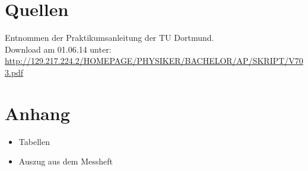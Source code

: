 \documentclass[11pt,ngerman,a4paper]{article}
\begin{document}
\section{Quellen}
\begin{enumerate}[{[}1{]}]
\item Entnommen der Praktikumsanleitung \textit{} der TU Dortmund. \\
Download am 01.06.14 unter:\\
 \url{http://129.217.224.2/HOMEPAGE/PHYSIKER/BACHELOR/AP/SKRIPT/V703.pdf}
\end{enumerate}

\section{Anhang}
\begin{itemize}
\item Tabellen
\item Auszug aus dem Messheft
\end{itemize}
\end{document}
